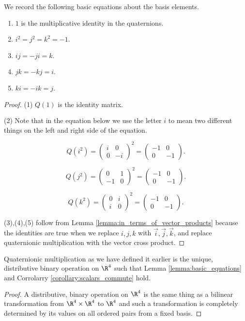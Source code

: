 \documentclass[oneside,12pt]{amsart}
\begin{document}
\begin{lemma} We record the following basic equations about the basis elements.
\label{lemma:basic_equations}
\begin{enumerate}
\item $1$ is the multiplicative identity in the quaternions.
\item $i^2=j^2=k^2 = -1$.
\item $ij = -ji = k$.
\item $jk = -kj = i$.
\item $ki = -ik = j$.
\end{enumerate}
\end{lemma}
\begin{proof}
(1) $Q(1)$ is the identity matrix.

(2) Note that in the equation below we use the letter $i$ to mean two different things
on the left and right side of the equation.

$$Q(i^2) = \begin{pmatrix}i & 0 \\ 0 & -i\end{pmatrix}^2 = \begin{pmatrix}-1 & 0 \\ 0 & -1\end{pmatrix}.$$

$$Q(j^2) = \begin{pmatrix}0 & 1 \\ -1 & 0\end{pmatrix}^2 = \begin{pmatrix}-1 & 0 \\ 0 & -1\end{pmatrix}.$$

$$Q(k^2) = \begin{pmatrix}0 & i \\ i & 0\end{pmatrix}^2 = \begin{pmatrix}-1 & 0 \\ 0 & -1\end{pmatrix}.$$

(3),(4),(5) follow from Lemma \ref{lemma:in_terms_of_vector_products} because the identities are true when we
 replace $i,j,k$ with $\vec{i},\vec{j},\vec{k}$, and replace quaternionic multiplication with the vector cross product.
 \end{proof}

 \begin{lemma}
 Quaternionic multiplication as we have defined it earlier is the unique, distributive binary operation on $\R^4$ such that Lemma \ref{lemma:basic_equations}
 and Corrolarry \ref{corollary:scalars_commute} hold.
 \end{lemma}
 \begin{proof}
 A distributive, binary operation on $\R^4$ is the same thing as a
 bilinear transformation from $\R^4 \times \R^4$ to $\R^4$ and such a transformation
 is completely determined by its values on all ordered pairs from a fixed basis.
 \end{proof}
\end{document}
